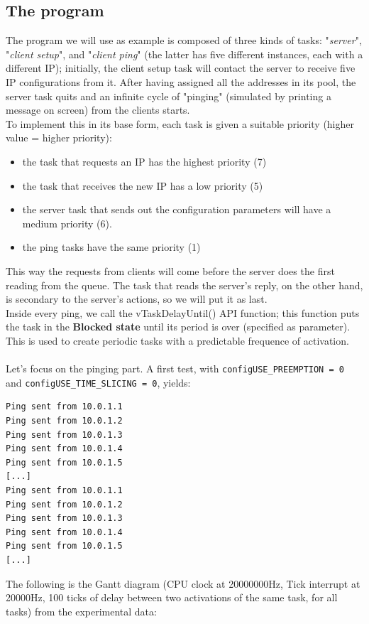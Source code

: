 \documentclass[10pt]{article}
\begin{document}
\subsection{The program}
The program we will use as example is composed of three kinds of tasks: "\textit{server}", "\textit{client setup}", and "\textit{client ping}" (the latter has five different instances, each with a different IP); initially, the client setup task will contact the server to receive five IP configurations from it. After having assigned all the addresses in its pool, the server task quits and an infinite cycle of "pinging" (simulated by printing a message on screen) from the clients starts.\\
To implement this in its base form, each task is given a suitable priority (higher value = higher priority):
\begin{itemize}
\item the task that requests an IP has the highest priority (7)
\item the task that receives the new IP has a low priority (5)
\item the server task that sends out the configuration parameters will have a medium priority (6).
\item the ping tasks have the same priority (1)
\end{itemize}
This way the requests from clients will come before the server does the first reading from the queue. The task that reads the server's reply, on the other hand, is secondary to the server's actions, so we will put it as last.\\
Inside every ping, we call the vTaskDelayUntil() API function; this function puts the task in the \textbf{Blocked state} until its period is over (specified as parameter). This is used to create periodic tasks with a predictable frequence of activation.
\\
\\
Let's focus on the pinging part. A first test, with \verb|configUSE_PREEMPTION = 0| and \verb|configUSE_TIME_SLICING = 0|, yields:
\begin{lstlisting}
Ping sent from 10.0.1.1
Ping sent from 10.0.1.2
Ping sent from 10.0.1.3
Ping sent from 10.0.1.4
Ping sent from 10.0.1.5
[...]
Ping sent from 10.0.1.1
Ping sent from 10.0.1.2
Ping sent from 10.0.1.3
Ping sent from 10.0.1.4
Ping sent from 10.0.1.5
[...]
\end{lstlisting}
The following is the Gantt diagram (CPU clock at 20000000Hz, Tick interrupt at 20000Hz, 100 ticks of delay between two activations of the same task, for all tasks) from the experimental data:
\end{document}
